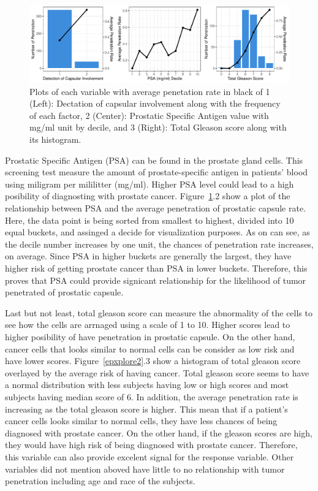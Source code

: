 \documentclass[11pt]{article}\usepackage[]{graphicx}\usepackage[]{color}
\makeatletter
\def\maxwidth{ %
  \ifdim\Gin@nat@width>\linewidth
    \linewidth
  \else
    \Gin@nat@width
  \fi
}
\makeatother
\begin{document}
\begin{figure}[h!] 
\begin{center}

\includegraphics[width=\maxwidth]{figure/unnamed-chunk-2-1} 

\caption{Plots of each variable with average penetation rate in black of 1 (Left): Dectation of capsular involvement along with the frequency of each factor, 2 (Center): Prostatic Specific Antigen value with mg/ml unit by decile, and 3 (Right): Total Gleason score along with its histogram.}
\label{explore2}
\end{center} 
\end{figure}

Prostatic Specific Antigen (PSA) can be found in the prostate gland cells. This screening test measure the amount of prostate-specific antigen in patients' blood using miligram per mililitter (mg/ml). Higher PSA level could lead to a high posibility of diagnosting with prostate cancer. Figure~\ref{explore2}.2 show a plot of the relationship between PSA and the average penetration of prostatic capsule rate. Here, the data point is being sorted from smallest to highest, divided into 10 equal buckets, and assinged a decide for visualization purposes. As on can see, as the decile number increases by one unit, the chances of penetration rate increases, on average. Since PSA in higher buckets are generally the largest, they have higher risk of getting prostate cancer than PSA in lower buckets. Therefore, this proves that PSA could provide signicant relationship for the likelihood of tumor penetrated of prostatic capsule. 
\hfill \break

\noindent Last but not least, total gleason score can measure the abnormality of the cells to see how the cells are arrnaged using a scale of 1 to 10. Higher scores lead to higher posibility of have penetration in prostatic capsule. On the other hand, cancer cells that looks similar to normal cells can be consider as low risk and have lower scores. Figure~\ref{epxplore2}.3 show a histogram of total gleason score overlayed by the average risk of having cancer. Total gleason score seems to have a normal distribution with less subjects having low or high scores and most subjects having median score of 6. In addition, the average penetration rate is increasing as the total gleason score is higher. This mean that if a patient's cancer cells looks similar to normal cells, they have less chances of being diagnosed with prostate cancer. On the other hand, if the gleason scores are high, they would have high risk of being diagnosed with prostate cancer. Therefore, this variable can also provide excelent signal for the response variable. Other variables did not mention aboved have little to no relationship with tumor penetration including age and race of the subjects.   
\hfill \break
\end{document}
